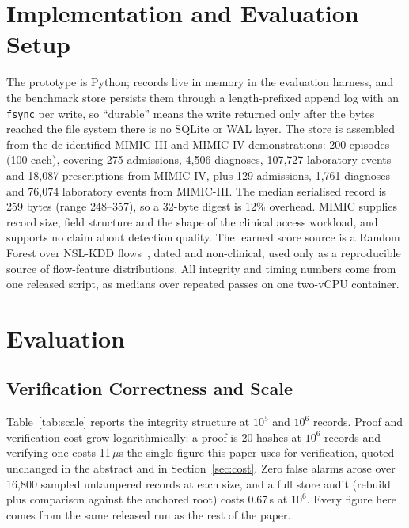 \documentclass[conference]{IEEEtran}
\begin{document}
\section{Implementation and Evaluation Setup}
\label{sec:setup}

The prototype is Python; records live in memory in the evaluation harness, and the benchmark store persists
them through a length-prefixed append log with an \texttt{fsync} per write, so ``durable'' means the write
returned only after the bytes reached the file system there is no SQLite or WAL layer. The store is
assembled from the de-identified MIMIC-III and MIMIC-IV demonstrations: 200 episodes (100 each), covering 275
admissions, 4{,}506 diagnoses, 107{,}727 laboratory events and 18{,}087 prescriptions from MIMIC-IV, plus 129
admissions, 1{,}761 diagnoses and 76{,}074 laboratory events from MIMIC-III. The median serialised record is
259 bytes (range 248--357), so a 32-byte digest is 12\% overhead. MIMIC supplies record size, field structure
and the shape of the clinical access workload, and supports no claim about detection quality. The learned score
source is a Random Forest over NSL-KDD flows~\cite{nslkdd}, dated and non-clinical, used only as a
reproducible source of flow-feature distributions. All integrity and timing numbers come from one released
script, as medians over repeated passes on one two-vCPU container.

\section{Evaluation}
\label{sec:eval}

\subsection{Verification Correctness and Scale}
\label{sec:scale}
Table~\ref{tab:scale} reports the integrity structure at $10^5$ and $10^6$ records. Proof and verification
cost grow logarithmically: a proof is 20 hashes at $10^6$ records and verifying one costs 11\,$\mu$s the
single figure this paper uses for verification, quoted unchanged in the abstract and in Section~\ref{sec:cost}.
Zero false alarms arose over 16{,}800 sampled untampered records at each size, and a full store audit
(rebuild plus comparison against the anchored root) costs 0.67\,s at $10^6$. Every figure here comes from the
same released run as the rest of the paper.
\end{document}
